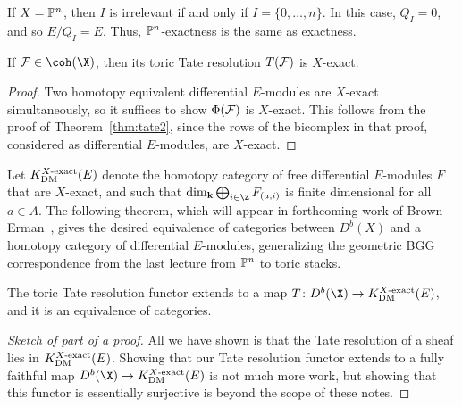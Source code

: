 \documentclass{amsart}
\begin{document}
\begin{example}
    If $X=\mathbb P^n$, then $I$ is irrelevant if and only if $I=\{0, \dots, n\}$.  In this case, $Q_I = 0$, and so $E/Q_I=E$. Thus, $\mathbb P^n$-exactness is the same as exactness.
\end{example}

\begin{prop}
If $\F \in \coh(\X)$, then its toric Tate resolution $T(\mathcal{F})$ is $X$-exact.
\end{prop}

\begin{proof}
Two homotopy equivalent differential $E$-modules are $X$-exact simultaneously, so it suffices to show $\Phi(\mathcal{F})$ is $X$-exact. This follows from the proof of Theorem~\ref{thm:tate2}, since the rows of the bicomplex in that proof, considered as differential $E$-modules, are $X$-exact.
\end{proof}

Let $K_{\operatorname{DM}}^{X\text{-exact}}(E)$ denote the homotopy category of free differential $E$-modules $F$ that are $X$-exact, and such that $\dim_\k \bigoplus_{i \in \Z} F_{(a;i)}$ is finite dimensional for all $a \in A$. The following theorem, which will appear in forthcoming work of Brown-Erman~\cite{BEfuture}, gives the desired equivalence of categories between $D^b(X)$ and a homotopy category of differential $E$-modules, generalizing the geometric BGG correspondence from the last lecture from $\mathbb P^n$ to toric stacks.

\begin{thm}
The toric Tate resolution functor extends to a map $T \co D^b(\X) \to K_{\DM}^{X\text{-exact}}(E)$, and it is an equivalence of categories.
\end{thm}

\begin{proof}[Sketch of part of a proof]
All we have shown is that the Tate resolution of a sheaf lies in $K_{\operatorname{DM}}^{X\text{-exact}}(E)$. Showing that our Tate resolution functor extends to a fully faithful map $D^b(\X) \to K_{\DM}^{X\text{-exact}}(E)$ is not much more work, but showing that this functor is essentially surjective is beyond the scope of these notes.
\end{proof}


\ifdefined\whole
\else


\end{document}
